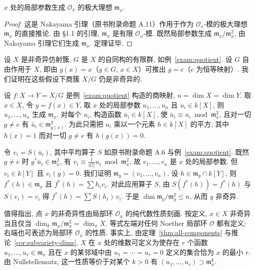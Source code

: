 \begin{theorem}\label{thm:params-generate}
	$x$ 处的局部参数生成 $\mathcal O_x$ 的极大理想 $\mathfrak m_x$.
\end{theorem}

\begin{proof}
	这是 Nakayama 引理（原书附录命题 A.11）作用于作为 $\mathcal O_x$-模的极大理想 $\mathfrak m_x$ 的直接推论. 由 §1.1 的引理, $\mathfrak m_x$ 是有限 $\mathcal O_x$-模. 既然局部参数生成 $\mathfrak m_x/\mathfrak m_x^2$, 由 Nakayama 引理它们生成 $\mathfrak m_x$. 定理证毕.
\end{proof}

\begin{example}[自由作用的商]\label{exam:quotient-nonsingular}
	设 $X$ 是非奇异仿射簇, $G$ 是 $X$ 的自同构的有限群, 如例~\ref{exam:quotient}. 设 $G$ 自由作用于 $X$, 即由 $g(x) = x$（$g \in G$, $x \in X$）可推出 $g = e$（$e$ 为恒等映射）. 我们证明在这些假设下商簇 $X/G$ 仍是非奇异的.

	设 $f: X \to Y = X/G$ 是例~\ref{exam:quotient} 构造的商映射, $n = \dim X = \dim Y$. 取 $x \in X$, 令 $y = f(x) \in Y$, 取 $x$ 处的局部参数 $u_1, \ldots, u_n$ 且 $u_i \in k[X]$, 则 $u_1, \ldots, u_n$ 生成 $\mathfrak m_x$. 对每个 $u_i$, 构造函数 $\bar u_i \in k[X]$, 使 $\bar u_i \equiv u_i \bmod \mathfrak m_x^2$, 且对一切 $g \ne e$ 有 $\bar u_i \in \mathfrak m_{g(x)}^2$. 为此只需把 $u_i$ 乘以一个元素 $h \in k[X]$ 的平方, 其中 $h(x) = 1$ 而对一切 $g \ne e$ 有 $h(g(x)) = 0$.

	令 $v_i = S(\bar u_i)$, 其中平均算子 $S$ 如原书附录命题 A.6 与例~\ref{exam:quotient}. 既然 $g \ne e$ 时 $g^* \bar u_i \in \mathfrak m_x^2$, 有 $v_i \equiv \frac{1}{|G|} u_i \bmod \mathfrak m_x^2$, 故 $v_1, \ldots, v_n$ 是 $x$ 处的局部参数. 但 $v_i \in k[Y]$ 且 $v_i(y) = 0$. 我们证明 $\mathfrak m_y = (v_1, \ldots, v_n)$. 设 $h \in \mathfrak m_y \cap k[Y]$, 则 $f^*(h) \in \mathfrak m_x$ 且 $f^*(h) = \sum h_i v_i$. 对此应用算子 $S$, 由 $S(f^*(h)) = f^*(h)$ 与 $S(v_i) = v_i$ 得 $f^*(h) = \sum S(h_i)\, v_i$. 于是 $\dim \mathfrak m_y/\mathfrak m_y^2 \le n$, 从而 $y$ 非奇异.
\end{example}

值得指出, 点 $x$ 的非奇异性由局部环 $\mathcal O_x$ 的纯代数性质刻画. 按定义, $x \in X$ 非奇异当且仅当 $\dim_k \mathfrak m_x/\mathfrak m_x^2 = \dim_x X$. 等式左端对任何 Noether 局部环 $\mathcal O$ 都有定义; 右端也可表述为局部环 $\mathcal O_x$ 的性质. 事实上, 由定理~\ref{thm:all-components} 与推论~\ref{cor:subvariety-dims}, $X$ 在 $x$ 处的维数可定义为使存在 $r$ 个函数 $u_1, \ldots, u_r \in \mathfrak m_x$ 且在 $x$ 的某邻域中由 $u_1 = \cdots = u_r = 0$ 定义的集合恰为 $x$ 的最小 $r$. 由 Nullstellensatz, 这一性质等价于对某个 $k > 0$ 有 $(u_1, \ldots, u_r) \supset \mathfrak m_x^k$.

